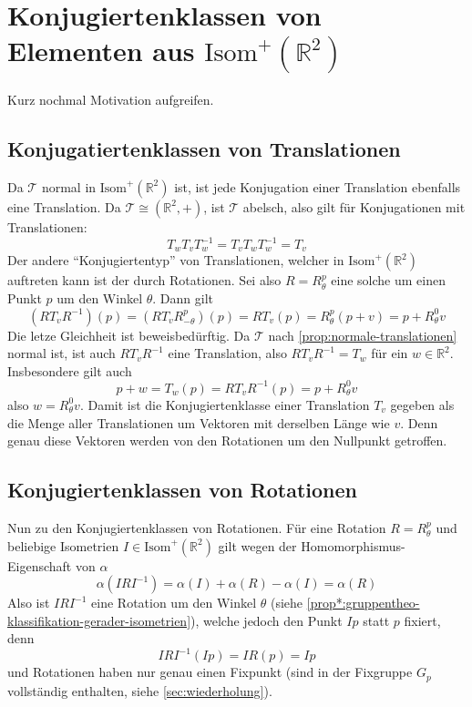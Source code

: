 \documentclass[a4paper, ngerman]{article}
\numberwithin{equation}{chapter}
\theoremstyle{plain}
\theoremstyle{definition}
\newcommand{\geradisometr}{\ensuremath{\mathrm{Isom}^+(\mathbb R^2)}}
\newcommand{\anm}[1]{{\color{red} #1}}
\begin{document}
\section{Konjugiertenklassen von Elementen aus \(\geradisometr\)}\label{sec:konjugiertenklassen-gerader-isometrien}

\anm{Kurz nochmal Motivation aufgreifen.}

\subsection{Konjugatiertenklassen von Translationen}\label{subsec:konjugiertenklassen-von-translationen}
Da \(\mathcal T\) normal in \(\geradisometr\) ist, ist jede Konjugation einer Translation ebenfalls eine Translation. Da \(\mathcal T \cong (\mathbb R^2, +)\), ist \(\mathcal T\) abelsch, also gilt für Konjugationen mit Translationen: 
\begin{equation*}
    T_w T_v T_w^{-1} = T_v T_w T_w^{-1} = T_v
\end{equation*}
Der andere "`Konjugiertentyp"' von Translationen, welcher in \(\geradisometr\) auftreten kann ist der durch Rotationen. Sei also \(R = R_\theta^p\) eine solche um einen Punkt \(p\) um den Winkel \(\theta\). Dann gilt 
\begin{equation*}
    (RT_vR^{-1})(p) = (RT_vR_{-\theta}^p)(p) = RT_v(p) = R_\theta^p (p+v) = p + R_\theta^0 v
\end{equation*}
\anm{Die letze Gleichheit ist beweisbedürftig.} Da \(\mathcal T\) nach \cref{prop:normale-translationen} normal ist, ist auch \(RT_vR^{-1}\) eine Translation, also \(RT_vR^{-1} = T_w\) für ein \(w \in \mathbb R^2\). Insbesondere gilt auch 
\begin{equation*}
    p + w = T_w(p) = RT_vR^{-1}(p) = p + R_\theta^0 v
\end{equation*}
also \(w = R_\theta^0 v\). Damit ist die Konjugiertenklasse einer Translation \(T_v\) gegeben als die Menge aller Translationen um Vektoren mit derselben Länge wie \(v\). Denn genau diese Vektoren werden von den Rotationen um den Nullpunkt getroffen. 

\subsection{Konjugiertenklassen von Rotationen}\label{subsec:konjugiertenklassen-von-rotationen}
Nun zu den Konjugiertenklassen von Rotationen. Für eine Rotation \(R = R_\theta^p\) und beliebige Isometrien \(I \in \geradisometr\) gilt wegen der Homomorphismus-Eigenschaft von \(\alpha\) 
\begin{equation*}
    \alpha(IRI^{-1}) = \alpha(I) + \alpha(R) - \alpha(I) = \alpha(R)
\end{equation*}
Also ist \(IRI^{-1}\) eine Rotation um den Winkel \(\theta\) (siehe \cref{prop*:gruppentheo-klassifikation-gerader-isometrien}), welche jedoch den Punkt \(Ip\) statt \(p\) fixiert, denn
\begin{equation*}
    IRI^{-1}(Ip) = IR(p) = Ip
\end{equation*}
und Rotationen haben nur genau einen Fixpunkt (sind in der Fixgruppe \(G_p\) vollständig enthalten, siehe \cref{sec:wiederholung}). 
\end{document}
